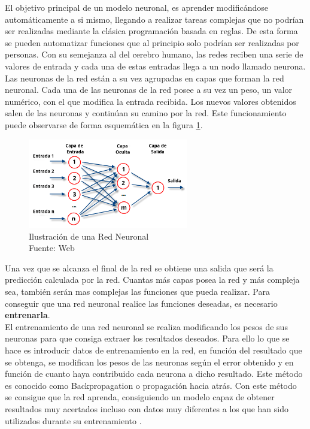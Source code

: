 El objetivo principal de un modelo neuronal, es aprender modificándose automáticamente a si mismo, llegando a realizar tareas complejas que no podrían ser realizadas mediante la clásica programación basada en reglas. De esta forma se pueden automatizar funciones que al principio solo podrían ser realizadas por personas. Con su semejanza al del cerebro humano, las redes reciben una serie de valores de entrada y cada una de estas entradas llega a un nodo llamado neurona.\\

Las neuronas de la red están a su vez agrupadas en capas que forman la red neuronal. Cada una de las neuronas de la red posee a su vez un peso, un valor numérico, con el que modifica la entrada recibida. Los nuevos valores obtenidos salen de las neuronas y continúan su camino por la red. Este funcionamiento puede observarse de forma esquemática en la figura \ref{fig:estructura_red_neuronal}.\\

\begin{figure}[H]
    \begin{center}
        \includegraphics[width=7cm]{img/capitulo_2/Redes_neuronales_esquema.png}
    \end{center}
    \caption{Ilustración de una Red Neuronal
        \\Fuente: Web}
    \label{fig:estructura_red_neuronal}
\end{figure}

Una vez que se alcanza el final de la red se obtiene una salida que será la predicción calculada por la red. Cuantas más capas posea la red y más compleja sea, también serán mas complejas las funciones que pueda realizar. Para conseguir que una red neuronal realice las funciones deseadas, es necesario \textbf{entrenarla}.\\

El entrenamiento de una red neuronal se realiza modificando los pesos de sus neuronas para que consiga extraer los resultados deseados. Para ello lo que se hace es introducir datos de entrenamiento en la red, en función del resultado que se obtenga, se modifican los pesos de las neuronas según el error obtenido y en función de cuanto haya contribuido cada neurona a dicho resultado. Este método es conocido como Backpropagation o propagación hacia atrás. Con este método se consigue que la red aprenda, consiguiendo un modelo capaz de obtener resultados muy acertados incluso con datos muy diferentes a los que han sido utilizados durante su entrenamiento \cite{atriainnovation:ia}.\\

